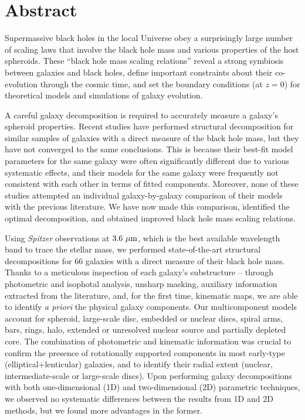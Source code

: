 \chapter*{Abstract}

Supermassive black holes in the local Universe obey a surprisingly large number of scaling laws 
that involve the black hole mass and various properties of the host spheroids. 
These ``black hole mass scaling relations'' reveal a strong symbiosis between galaxies and black holes, 
define important constraints about their co-evolution through the cosmic time, 
and set the boundary conditions (at $z=0$) for theoretical models and simulations of galaxy evolution. 

A careful galaxy decomposition is required to accurately measure a galaxy's spheroid properties. 
Recent studies have performed structural decomposition 
for similar samples of galaxies with a direct measure of the black hole mass, 
but they have not converged to the same conclusions. 
This is because their best-fit model parameters for the same galaxy were often significantly different 
due to various systematic effects, 
and their models for the same galaxy were frequently not consistent with each other in terms of fitted components. 
Moreover, none of these studies attempted an individual galaxy-by-galaxy comparison of their models 
with the previous literature. 
We have now made this comparison, identified the optimal decomposition, 
and obtained improved black hole mass scaling relations. 

Using \emph{Spitzer} observations at $3.6 ~\mu \rm m$, 
which is the best available wavelength band to trace the stellar mass, 
we performed state-of-the-art structural decompositions for $66$ galaxies 
with a direct measure of their black hole mass. 
Thanks to a meticulous inspection of each galaxy's substructure -- 
through photometric and isophotal analysis, unsharp masking, auxiliary information extracted from the literature, 
and, for the first time, kinematic maps, 
we are able to identify \emph{a priori} the physical galaxy components. 
Our multicomponent models account for spheroid, large-scale disc, 
embedded or nuclear discs, spiral arms, bars, rings, halo, extended or unresolved nuclear source and partially depleted core. 
The combination of photometric and kinematic information was crucial 
to confirm the presence of rotationally supported components in most early-type (elliptical+lenticular) galaxies, 
and to identify their radial extent (nuclear, intermediate-scale or large-scale discs). 
Upon performing galaxy decompositions with both one-dimensional (1D) and two-dimensional (2D) parametric techniques, 
we observed no systematic differences between the results from 1D and 2D methods, 
but we found more advantages in the former. 
















